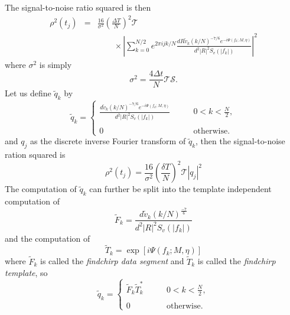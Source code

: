 The signal-to-noise ratio squared is then
\begin{eqnarray}
\rho^2(t_j) &=& 
\frac{16}{\sigma^2}\left(\frac{\Delta T}{N}\right)^2 \mathcal{T} \nonumber \\
&&\quad\quad\times
\left| 
  \sum_{k=0}^{N/2} e^{2\pi ijk/N} 
  \frac{dR\tilde{v}_k (k/N)^{-7/6} e^{-i\Psi(f_k;M,\eta)}}
       {d^2|R|^2 S_v\left(\left|f_k\right|\right)}
\right|^2 
\end{eqnarray}
where $\sigma^2$ is simply
\begin{equation}
\sigma^2 = \frac{4\Delta t}{N} \mathcal{T}\mathcal{S}.
\end{equation}
Let us define $\tilde{q}_k$ by
\begin{equation}
\label{eq:qtildedef}
\tilde{q}_k = \left\{
\begin{array}{ll}
\frac{d\tilde{v}_k (k/N)^{-7/6} e^{-i\Psi(f_k;M,\eta)}}
     {d^2|R|^2S_v\left(\left|f_k\right|\right)} 
  \quad\quad & 0 < k < \frac{N}{2},\\
\\
0 & \mathrm{otherwise}.
\end{array}
\right.
\end{equation}
and $q_j$ as the discrete inverse Fourier transform of $\tilde{q}_k$, then
the signal-to-noise ration squared is
\begin{equation}
\rho^2(t_j) = \frac{16}{\sigma^2}\left(\frac{\delta T}{N}\right)^2 \mathcal{T}
\left|q_j\right|^2
\end{equation}
The computation of $\tilde{q}_k$ can further be split into the template
independent computation of
\begin{equation}
\tilde{F}_k = \frac{d\tilde{v}_k (k/N)^\frac{-7}{6}}
{d^2|R|^2S_v\left(\left|f_k\right|\right)}
\end{equation}
and the computation of
\begin{equation}
\tilde{T}_k = \exp\left[i\Psi(f_k;M,\eta)\right]
\end{equation}
where $\tilde{F}_k$ is called the \emph{findchirp data segment} and 
$\tilde{T}_k$ is called the \emph{findchirp template}, so
\begin{equation}
\tilde{q}_k = \left\{
\begin{array}{ll}
\tilde{F}_k \tilde{T}_k^\ast \quad\quad & 0 < k < \frac{N}{2},\\
\\
0 & \mathrm{otherwise}.
\end{array}
\right.
\end{equation}

